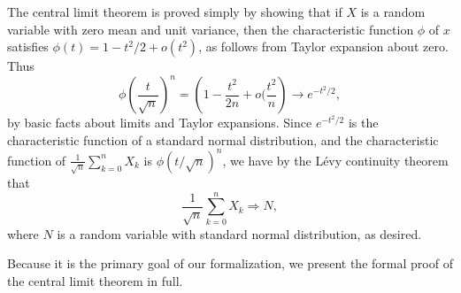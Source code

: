 \documentclass[leqno]{article}
\theoremstyle{definition}
\begin{document}
The central limit theorem is proved simply by showing that if $X$ is a random variable with zero mean and unit variance, then the characteristic function $\phi$ of $x$ satisfies $\phi(t) = 1 - t^2/2 + o(t^2)$, as follows from Taylor expansion about zero. Thus
\[ \phi\left(\frac{t}{\sqrt n}\right)^n = \left(1 - \frac{t^2}{2n} + o(\frac{t^2}{n}\right) \rightarrow e^{-t^2/2}, \]
by basic facts about limits and Taylor expansions. Since $e^{-t^2/2}$ is the characteristic function of a standard normal distribution, and the characteristic function of $\frac{1}{\sqrt n} \sum_{k=0}^n X_k$ is $\phi(t/\sqrt n)^n$, we have by the L\'evy continuity theorem that
\[ \frac{1}{\sqrt n} \sum_{k=0}^n X_k \Rightarrow N, \]
where $N$ is a random variable with standard normal distribution, as desired.

Because it is the primary goal of our formalization, we present the formal proof of the central limit theorem in full.

\medskip
\end{document}
